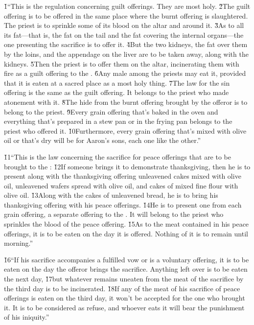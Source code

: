 \v{1}``This is the regulation concerning guilt offerings. They are most holy. \v{2}The guilt offering is to be offered in the same place where the burnt offering is slaughtered. The priest is to sprinkle some of its blood on the altar and around it. \v{3}As to all its fat---that is, the fat on the tail and the fat covering the internal organs---the one presenting the sacrifice is to offer it. \v{4}But the two kidneys, the fat over them by the loins, and the appendage on the liver are to be taken away, along with the kidneys. \v{5}Then the priest is to offer them on the altar, incinerating them with fire as a guilt offering to the . \v{6}Any male among the priests may eat it, provided that it is eaten at a sacred place as a most holy thing. \v{7}The law for the sin offering is the same as the guilt offering. It belongs to the priest who made atonement with it. \v{8}The hide from the burnt offering brought by the offeror is to belong to the priest. \v{9}Every grain offering that's baked in the oven and everything that's prepared in a stew pan or in the frying pan belongs to the priest who offered it. \v{10}Furthermore, every grain offering that's mixed with olive oil or that's dry will be for Aaron's sons, each one like the other.''

\v{11}``This is the law concerning the sacrifice for peace offerings that are to be brought to the : \v{12}If someone brings it to demonstrate thanksgiving, then he is to present along with the thanksgiving offering unleavened cakes mixed with olive oil, unleavened wafers spread with olive oil, and cakes of mixed fine flour with olive oil. \v{13}Along with the cakes of unleavened bread, he is to bring his thanksgiving offering with his peace offerings. \v{14}He is to present one from each grain offering, a separate offering to the . It will belong to the priest who sprinkles the blood of the peace offering. \v{15}As to the meat contained in his peace offerings, it is to be eaten on the day it is offered. Nothing of it is to remain until morning.''

\v{16}``If his sacrifice accompanies a fulfilled vow or is a voluntary offering, it is to be eaten on the day the offeror brings the sacrifice. Anything left over is to be eaten the next day, \v{17}but whatever remains uneaten from the meat of the sacrifice by the third day is to be incinerated. \v{18}If any of the meat of his sacrifice of peace offerings is eaten on the third day, it won't be accepted for the one who brought it. It is to be considered as refuse, and whoever eats it will bear the punishment of his iniquity.''

